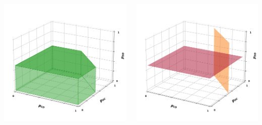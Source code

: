 \documentclass{beamer}
\begin{document}
\begin{frame}
    \begin{columns}
        \centering
        \begin{column}{.5\textwidth}
        \centering
    \includegraphics[width=\textwidth]{static/two_bit_result.png}
        \end{column}
        \begin{column}{.5\textwidth}
            \centering
        \includegraphics[width=\textwidth]{static/two_bit_result_two.png}
            \end{column}
    \end{columns}
\end{frame}
\end{document}
